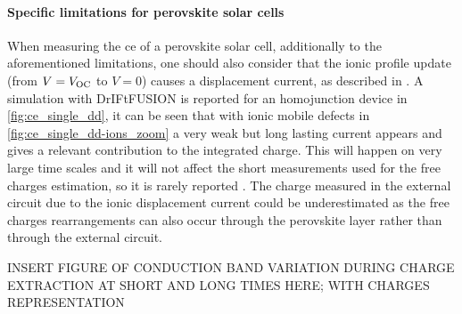 	\paragraph{Specific limitations for perovskite solar cells} \label{ce_limitations_perovskite}
	When measuring the \gls{ce} of a perovskite solar cell, additionally to the aforementioned limitations, one should also consider that the ionic profile update (from $V=V_\mathrm{OC}$ to $V=0$) causes a displacement current, as described in .
	A simulation with DrIFtFUSION is reported for an homojunction device in \cref{fig:ce_single_dd}, it can be seen that with ionic mobile defects in \cref{fig:ce_single_dd-ions_zoom} a very weak but long lasting current appears and gives a relevant contribution to the integrated charge.
	This will happen on very large time scales and it will not affect the short measurements used for the free charges estimation, so it is rarely reported \cite{ORegan2015b}.
	The charge measured in the external circuit due to the ionic displacement current could be underestimated as the free charges rearrangements can also occur through the perovskite layer rather than through the external circuit.

	INSERT FIGURE OF CONDUCTION BAND VARIATION DURING CHARGE EXTRACTION AT SHORT AND LONG TIMES HERE; WITH CHARGES REPRESENTATION

